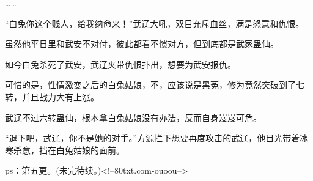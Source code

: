 \begin{this_body}
……

“白兔你这个贱人，给我纳命来！”武辽大吼，双目充斥血丝，满是怒意和仇恨。

虽然他平日里和武安不对付，彼此都看不惯对方，但到底都是武家蛊仙。

如今白兔杀死了武安，武辽夹带仇恨扑出，想要为武安报仇。

可惜的是，性情激变之后的白兔姑娘，不，应该说是黑莬，修为竟然突破到了七转，并且战力大有上涨。

武辽不过六转蛊仙，根本拿白兔姑娘没有办法，反而自身岌岌可危。

“退下吧，武辽，你不是她的对手。”方源拦下想要再度攻击的武辽，他目光带着冰寒杀意，挡在白兔姑娘的面前。

ps：第五更。(未完待续。)<!--80txt.com-ouoou-->

\end{this_body}

